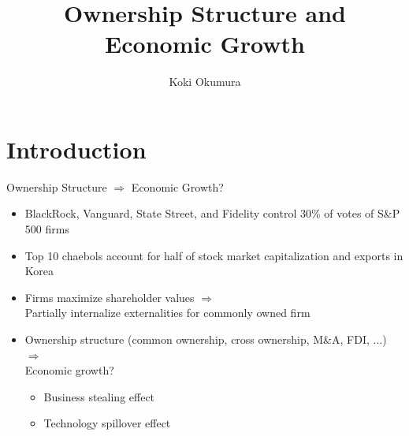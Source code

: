 \documentclass[
  aspectratio=169,  %
]{beamer}
\title{Ownership Structure and Economic Growth}
\author{Koki Okumura}
\institute{UCLA}
\date{}
\theoremstyle{plain}
\begin{document}
\begin{frame}
  \titlepage
\end{frame}

\section{Introduction}

\begin{frame}{Ownership Structure $\Longrightarrow$ Economic Growth?}
  \label{intro} %
  \begin{itemize}
    \item BlackRock, Vanguard, State Street, and Fidelity control 30\% of votes
          of S\&P 500 firms \hfill \hyperlink{share}{}
    \item Top 10 chaebols account for half of stock market capitalization
          and exports in Korea
    \medskip{} \pause
    \item Firms maximize shareholder values $\Longrightarrow$ \\
          Partially internalize externalities for commonly owned firm
    \medskip{} \pause
    \item Ownership structure (common ownership, cross ownership, M\&A, FDI, ...) $\Longrightarrow$ \\
          Economic growth?
          \begin{itemize}
            \item Business stealing effect
            \item Technology spillover effect
          \end{itemize}
  \end{itemize}
\end{frame}
\end{document}
